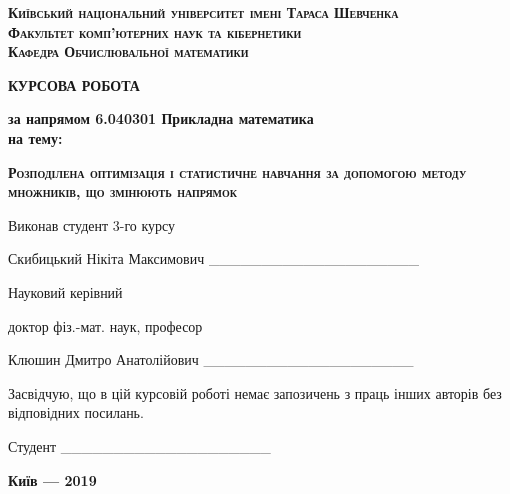 \thispagestyle{empty}

\begin{center}
    \large{\textbf{\textsc{
    Київський національний університет імені Тараса Шевченка \\
    Факультет комп'ютерних наук та кібернетики \\
    Кафедра Обчислювальної математики}}}
\end{center}

\vfill
\vfill
\vfill  

\begin{center}
    \Large{\textbf{\textsc{
    КУРСОВА РОБОТА}}}
\end{center}

\begin{center}    
    \large{\textbf{
    за напрямом 6.040301 Прикладна математика \\
    на тему:}}
\end{center}

\begin{center}
    \Large{\textbf{\textsc{
    Розподілена оптимізація і статистичне навчання за допомогою методу множників, що змінюють напрямок}}}
\end{center}

\vfill

\begin{flushleft}
    Виконав студент 3-го курсу \smallskip
    
    Скибицький Нікіта Максимович \qquad \qquad \qquad \qquad \_\!\_\!\_\!\_\!\_\!\_\!\_\!\_\!\_\!\_\!\_\!\_\!\_\!\_\!\_\!\_\!\_\!\_\!\_\!\_ \bigskip
        
    Науковий керівний \smallskip
    
    доктор фіз.-мат. наук, професор \smallskip
    
    Клюшин Дмитро Анатолійович  \qquad \qquad \qquad \qquad \_\!\_\!\_\!\_\!\_\!\_\!\_\!\_\!\_\!\_\!\_\!\_\!\_\!\_\!\_\!\_\!\_\!\_\!\_\!\_
\end{flushleft}


\vfill

\begin{flushright}
    \begin{minipage}{.45\textwidth}
        \quad Засвідчую, що в цій курсовій роботі немає запозичень з праць інших авторів без відповідних посилань. \bigskip
        
        \bigskip
        
        Студент \qquad \_\!\_\!\_\!\_\!\_\!\_\!\_\!\_\!\_\!\_\!\_\!\_\!\_\!\_\!\_\!\_\!\_\!\_\!\_\!\_
    \end{minipage}
\end{flushright}

\vfill
\vfill
\vfill

\begin{center}
    \large{\textbf{
    Київ --- 2019}}
\end{center}

\clearpage

